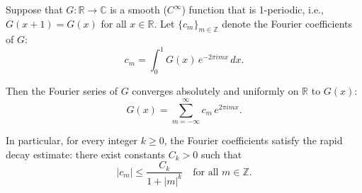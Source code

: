 \begin{theorem}
\label{theorem:fourier_series_of_smooth_1_periodic_functions_on_R_converge_absolutely_and_uniformly}
Suppose that $G : \mathbb{R} \to \mathbb{C}$ is a smooth ($C^\infty$) function that is 1-periodic, i.e., $G(x+1) = G(x)$ for all $x \in \mathbb{R}$. Let $\{c_m\}_{m \in \mathbb{Z}}$ denote the Fourier coefficients of $G$:
$$c_m = \int_0^1 G(x) \, e^{-2\pi i m x} \, dx.$$

Then the Fourier series of $G$ converges absolutely and uniformly on $\mathbb{R}$ to $G(x)$:
$$G(x) = \sum_{m=-\infty}^{\infty} c_m \, e^{2\pi i m x}.$$

In particular, for every integer $k \geq 0$, the Fourier coefficients satisfy the rapid decay estimate: there exist constants $C_k > 0$ such that
$$|c_m| \leq \frac{C_k}{1 + |m|^k} \quad \text{for all } m \in \mathbb{Z}.$$
\end{theorem}

